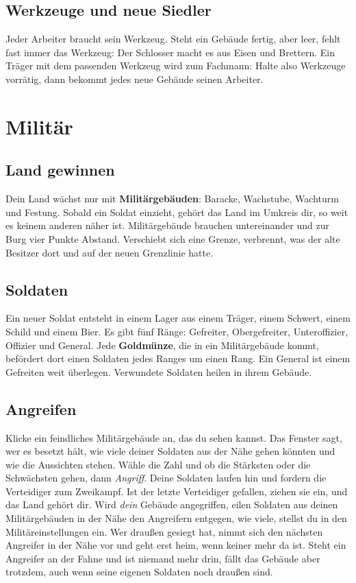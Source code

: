 \documentclass[a4paper,11pt,oneside,DIV=12,headings=small,toc=chapterentrydotfill]{scrbook}
\begin{document}

\section{Werkzeuge und neue Siedler}
Jeder Arbeiter braucht sein Werkzeug. Steht ein Gebäude fertig, aber leer, fehlt fast immer das Werkzeug:
Der Schlosser macht es aus Eisen und Brettern. Ein Träger mit dem passenden Werkzeug wird zum Fachmann: Halte also
Werkzeuge vorrätig, dann bekommt jedes neue Gebäude seinen Arbeiter.

\chapter{Militär}

\section{Land gewinnen}
Dein Land wächst nur mit \textbf{Militärgebäuden}: Baracke, Wachstube, Wachturm und Festung. Sobald ein Soldat
einzieht, gehört das Land im Umkreis dir, so weit es keinem anderen näher ist. Militärgebäude brauchen
untereinander und zur Burg vier Punkte Abstand. Verschiebt sich eine Grenze, verbrennt, was der alte Besitzer
dort und auf der neuen Grenzlinie hatte.

\section{Soldaten}
Ein neuer Soldat entsteht in einem Lager aus einem Träger, einem Schwert, einem Schild und einem Bier. Es gibt
fünf Ränge: Gefreiter, Obergefreiter, Unteroffizier, Offizier und General. Jede \textbf{Goldmünze}, die in ein
Militärgebäude kommt, befördert dort einen Soldaten jedes Ranges um einen Rang. Ein General ist einem
Gefreiten weit überlegen. Verwundete Soldaten heilen in ihrem Gebäude.

\section{Angreifen}
Klicke ein feindliches Militärgebäude an, das du sehen kannst. Das Fenster sagt, wer es besetzt hält, wie viele
deiner Soldaten aus der Nähe gehen könnten und wie die Aussichten stehen. Wähle die Zahl und ob die Stärksten
oder die Schwächsten gehen, dann \emph{Angriff}. Deine Soldaten laufen hin und fordern die Verteidiger zum
Zweikampf. Ist der letzte Verteidiger gefallen, ziehen sie ein, und das Land gehört dir. Wird \emph{dein} Gebäude angegriffen,
eilen Soldaten aus deinen Militärgebäuden in der Nähe den Angreifern entgegen, wie viele, stellst du in den
Militäreinstellungen ein. Wer draußen gesiegt hat, nimmt sich den nächsten Angreifer in der Nähe vor und geht
erst heim, wenn keiner mehr da ist. Steht ein Angreifer an der Fahne und ist niemand mehr drin, fällt das
Gebäude aber trotzdem, auch wenn seine eigenen Soldaten noch draußen sind.
\end{document}
